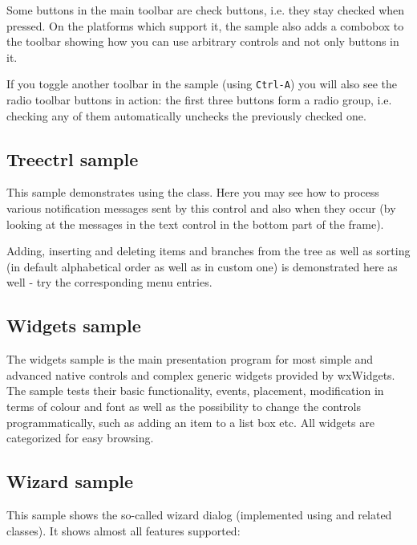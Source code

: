 Some buttons in the main toolbar are check buttons, i.e. they stay checked when
pressed. On the platforms which support it, the sample also adds a combobox
to the toolbar showing how you can use arbitrary controls and not only buttons
in it.

If you toggle another toolbar in the sample (using {\tt Ctrl-A}) you will also
see the radio toolbar buttons in action: the first three buttons form a radio
group, i.e. checking any of them automatically unchecks the previously
checked one.


\subsection{Treectrl sample}\label{sampletreectrl}

This sample demonstrates using the  class. Here
you may see how to process various notification messages sent by this control
and also when they occur (by looking at the messages in the text control in
the bottom part of the frame).

Adding, inserting and deleting items and branches from the tree as well as
sorting (in default alphabetical order as well as in custom one) is
demonstrated here as well - try the corresponding menu entries.


\subsection{Widgets sample}\label{samplewidgets}

The widgets sample is the main presentation program for most simple and advanced
native controls and complex generic widgets provided by wxWidgets.
The sample tests their basic functionality, events, placement, modification
in terms of colour and font as well as the possibility to change
the controls programmatically, such as adding an item to a list box etc.
All widgets are categorized for easy browsing.

\subsection{Wizard sample}\label{samplewizard}

This sample shows the so-called wizard dialog (implemented using
 and related classes). It shows almost all
features supported:

